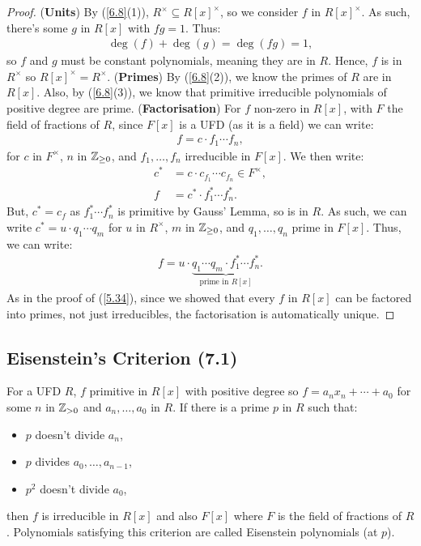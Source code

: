 \begin{proof}
    (\textbf{Units}) By (\ref{6.8}(1)), $R^\times \subseteq R[x]^\times$, so we consider
    $f$ in $R[x]^\times$. As such, there's some $g$ in $R[x]$ with $fg = 1$.
    Thus: \begin{align*}
        \deg(f) + \deg(g) = \deg(fg) = 1,
    \end{align*} so $f$ and $g$ must be constant polynomials, meaning
    they are in $R$. Hence, $f$ is in $R^\times$ so 
    $R[x]^\times = R^\times$.
    \bs
    (\textbf{Primes}) By (\ref{6.8}(2)), we know the primes of $R$ are in $R[x]$. Also,
    by (\ref{6.8}(3)), we know that primitive irreducible polynomials of positive degree
    are prime.
    \bs
    (\textbf{Factorisation})
    For $f$ non-zero in $R[x]$, with $F$ the field of fractions of $R$, since $F[x]$ is a UFD
    (as it is a field) we can write: \begin{align*}
        f = c \cdot f_1 \cdots f_n,
    \end{align*} for $c$ in $F^\times$, $n$ in $\mathbb{Z}_{\geq 0}$, and 
    $f_1, \ldots, f_n$ irreducible in $F[x]$. We then write: \begin{align*}
        c^\ast &= c \cdot c_{f_1} \cdots c_{f_n} \in F^\times, \\
        f &= c^\ast \cdot f_1^\ast \cdots f_n^\ast.
    \end{align*} But, $c^\ast = c_f$ as $f_1^\ast \cdots f_n^\ast$ is primitive by
    Gauss' Lemma, so is in $R$. As such, we can write $c^\ast = u \cdot q_1 \cdots q_m$
    for $u$ in $R^\times$, $m$ in $\mathbb{Z}_{\geq 0}$, and
    $q_1, \ldots, q_n$ prime in $F[x]$. Thus, we can write: \begin{align*}
        f = u \cdot \underbrace{q_1 \cdots q_m \cdot f_1^\ast \cdots f_n^\ast}_{
            \text{prime in } R[x]}.
    \end{align*}
    As in the proof of (\ref{5.34}), since we showed that every $f$ in $R[x]$ can be factored
    into primes, not just irreducibles, the factorisation is automatically unique.
\end{proof}

\newpage

\subsection{Eisenstein's Criterion (7.1)} \label{7.1}

For a UFD $R$, $f$ primitive in $R[x]$ with positive degree so $f = a_nx_n + \cdots + a_0$
for some $n$ in $\mathbb{Z}_{>0}$ and $a_n, \ldots, a_0$ in $R$. If there is a prime $p$ in
$R$ such that: \begin{itemize}
    \item $p$ doesn't divide $a_n$,
    \item $p$ divides $a_0, \ldots, a_{n - 1}$,
    \item $p^2$ doesn't divide $a_0$,
\end{itemize} then $f$ is irreducible in $R[x]$ and also $F[x]$ where $F$ is the field of
fractions of $R$. Polynomials satisfying this criterion are called Eisenstein polynomials
(at $p$).

